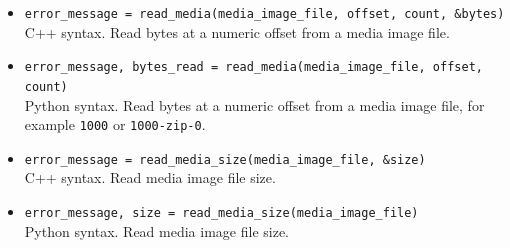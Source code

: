 \documentclass[11pt,fleqn]{article} %
\begin{document}
\begin{itemize}
\item \verb+error_message = read_media(media_image_file, offset, count, &bytes)+\\
C++ syntax.  Read bytes at a numeric offset from a media image file.
\item \verb+error_message, bytes_read = read_media(media_image_file, offset, count)+\\
Python syntax. Read bytes at a numeric offset from a media image file, for example \verb+1000+ or \verb+1000-zip-0+.
\item \verb+error_message = read_media_size(media_image_file, &size)+\\
C++ syntax.  Read media image file size.
\item \verb+error_message, size = read_media_size(media_image_file)+\\
Python syntax. Read media image file size.
\end{itemize}
\end{document}
